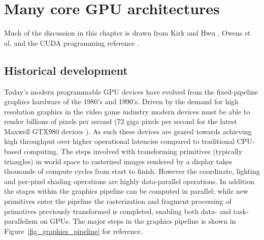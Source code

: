 \section{Many core GPU architectures}
Much of the discussion in this chapter is drawn from Kirk and Hwu \cite[ch. 1-3]{kirk2012programming}, Owens et al. \cite{owens2008gpu} and the CUDA
programming reference \cite{cuda}.
\subsection{Historical development}
Today's modern programmable GPU devices have evolved from the fixed-pipeline graphics hardware of the 1980's and 1990's. Driven by the demand
for high resolution graphics in the video game industry modern devices must be able to render billions of pixels per second (72 giga pixels per second 
for the latest Maxwell GTX980 devices \cite{gtx980}). As such these devices are geared towards achieving high throughput over higher operational latencies compared to traditional
CPU-based computing. The steps involved with transforming primitives (typically triangles) in world space to rasterized images rendered by a display takes thousands
of compute cycles from start to finish. However the coordinate, lighting and per-pixel shading operations are highly data-parallel operations. In addition the stages within
the graphics pipeline can be computed in parallel; while new primitives enter the pipeline the rasterization and fragment processing of primatives previously transformed is 
completed, enabling both data- and task-parallelism on GPUs. The major steps in the graphics pipeline is shown in Figure~\ref{fig_graphics_pipeline} for reference.

